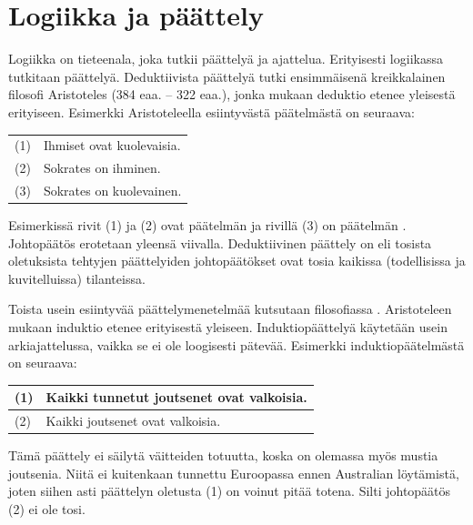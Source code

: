 \chapter{Logiikka ja päättely}%

Logiikka on tieteenala, joka tutkii päättelyä ja ajattelua. Erityisesti logiikassa tutkitaan  päättelyä. Deduktiivista päättelyä tutki ensimmäisenä kreikkalainen filosofi Aristoteles (384 eaa. -- 322 eaa.), jonka mukaan deduktio etenee yleisestä erityiseen. Esimerkki Aristoteleella esiintyvästä pää\-tel\-mäs\-tä on seuraava:

\bigskip

\begin{center}
\begin{tabular}{ll}
(1) & Ihmiset ovat kuolevaisia.\\ 
(2) & Sokrates on ihminen.\\ \hline
(3) & Sokrates on kuolevainen.
\end{tabular}
\end{center}

\bigskip

Esimerkissä rivit (1) ja (2) ovat päätelmän  ja rivillä (3) on päätelmän . Johtopäätös erotetaan yleensä viivalla. Deduktiivinen päättely on  eli tosista oletuksista tehtyjen päättelyiden johtopäätökset ovat tosia kaikissa (todellisissa ja kuvitelluissa) tilanteissa.

Toista usein esiintyvää päättelymenetelmää kutsutaan filosofiassa . Aristoteleen mukaan induktio etenee erityisestä yleiseen.  Induktiopäättelyä käytetään usein arkiajattelussa, vaikka se ei ole loogisesti pätevää. Esimerkki induktiopäätelmästä on seuraava:

\bigskip

\begin{center}
\begin{tabular}{ll}
(1) & Kaikki tunnetut joutsenet ovat valkoisia.\\ \hline
(2) & Kaikki joutsenet ovat valkoisia.
\end{tabular}
\end{center}

\bigskip

Tämä päättely ei säilytä väitteiden totuutta, koska on olemassa myös mustia joutsenia. Niitä ei kuitenkaan tunnettu Euroopassa ennen Australian löytämistä, joten siihen asti päättelyn oletusta (1) on voinut pitää totena. Silti johtopäätös (2) ei ole tosi.

